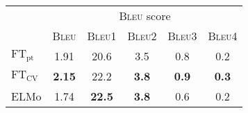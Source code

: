 \begin{table}[ht]
    \centering
    \begin{tabular}{@{}lccccc@{}}
    \toprule
     & \multicolumn{5}{c}{\textsc{Bleu} score}                                                        \\ \cmidrule{2-6} 
                      & \textsc{Bleu}           & \textsc{Bleu}1            & \textsc{Bleu}2             & \textsc{Bleu}3        & \textsc{Bleu}4 \\
    \midrule
     $\text{FT}_{\text{pt}}$ & 1.91 & 20.6 & 3.5 & 0.8 & 0.2 \\
     $\text{FT}_{\text{CV}}$  & \textbf{2.15} &22.2 & \textbf{3.8} &\textbf{0.9} & \textbf{0.3} \\
    ELMo              & 1.74                 & \textbf{22.5}                  &  \textbf{3.8}                 &  0.6                 & 0.2                                     \\ \bottomrule
    \end{tabular}
     \label{tab:bleu}
    \end{table}